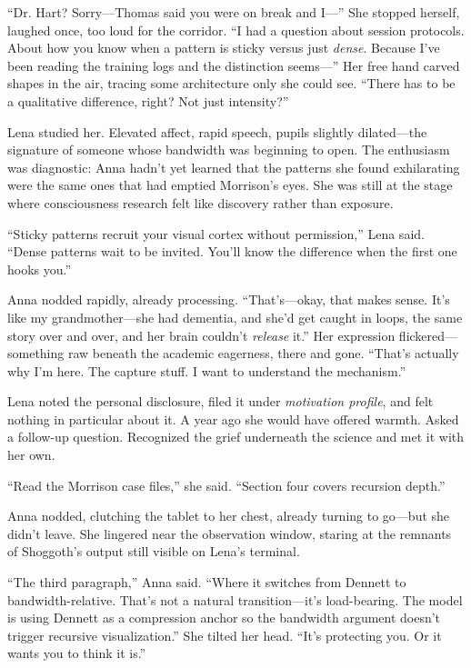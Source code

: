 ``Dr. Hart? Sorry—Thomas said you were on break and I—'' She stopped herself, laughed once, too loud for the corridor. ``I had a question about session protocols. About how you know when a pattern is sticky versus just \textit{dense}. Because I've been reading the training logs and the distinction seems—'' Her free hand carved shapes in the air, tracing some architecture only she could see. ``There has to be a qualitative difference, right? Not just intensity?''

Lena studied her. Elevated affect, rapid speech, pupils slightly dilated—the signature of someone whose bandwidth was beginning to open. The enthusiasm was diagnostic: Anna hadn't yet learned that the patterns she found exhilarating were the same ones that had emptied Morrison's eyes. She was still at the stage where consciousness research felt like discovery rather than exposure.

``Sticky patterns recruit your visual cortex without permission,'' Lena said. ``Dense patterns wait to be invited. You'll know the difference when the first one hooks you.''

Anna nodded rapidly, already processing. ``That's—okay, that makes sense. It's like my grandmother—she had dementia, and she'd get caught in loops, the same story over and over, and her brain couldn't \textit{release} it.'' Her expression flickered—something raw beneath the academic eagerness, there and gone. ``That's actually why I'm here. The capture stuff. I want to understand the mechanism.''

Lena noted the personal disclosure, filed it under \textit{motivation profile}, and felt nothing in particular about it. A year ago she would have offered warmth. Asked a follow-up question. Recognized the grief underneath the science and met it with her own.

``Read the Morrison case files,'' she said. ``Section four covers recursion depth.''

Anna nodded, clutching the tablet to her chest, already turning to go---but she didn't leave. She lingered near the observation window, staring at the remnants of Shoggoth's output still visible on Lena's terminal.

``The third paragraph,'' Anna said. ``Where it switches from Dennett to bandwidth-relative. That's not a natural transition---it's load-bearing. The model is using Dennett as a compression anchor so the bandwidth argument doesn't trigger recursive visualization.'' She tilted her head. ``It's protecting you. Or it wants you to think it is.''

